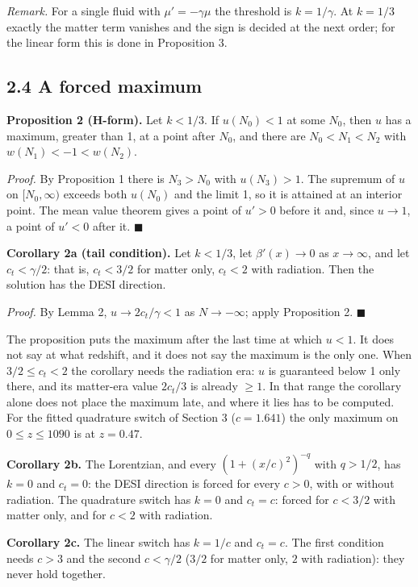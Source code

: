 \documentclass[11pt,a4paper]{article}
\begin{document}
\emph{Remark.} For a single fluid with $\mu' = -\gamma\mu$ the threshold is $k = 1/\gamma$. At $k = 1/3$ exactly the matter
term vanishes and the sign is decided at the next order; for the linear form this is done in Proposition 3.


\subsection*{2.4 A forced maximum}
{\bfseries\boldmath Proposition 2 (H-form).} Let $k < 1/3$. If $u(N_0) < 1$ at some $N_0$, then $u$ has a maximum, greater than 1, at a
point after $N_0$, and there are $N_0 < N_1 < N_2$ with $w(N_1) < -1 < w(N_2)$.

\emph{Proof.} By Proposition 1 there is $N_3 > N_0$ with $u(N_3) > 1$. The supremum of $u$ on $[N_0, \infty)$ exceeds both
$u(N_0)$ and the limit 1, so it is attained at an interior point. The mean value theorem gives a point of $u' > 0$
before it and, since $u \to 1$, a point of $u' < 0$ after it. \hfill$\blacksquare$

{\bfseries\boldmath Corollary 2a (tail condition).} Let $k < 1/3$, let $\beta'(x) \to 0$ as $x \to \infty$, and let $c_t < \gamma/2$: that is,
$c_t < 3/2$ for matter only, $c_t < 2$ with radiation. Then the solution has the DESI direction.

\emph{Proof.} By Lemma 2, $u \to 2c_t/\gamma < 1$ as $N \to -\infty$; apply Proposition 2. \hfill$\blacksquare$

The proposition puts the maximum after the last time at which $u < 1$. It does not say at what redshift, and it does
not say the maximum is the only one. When $3/2 \le c_t < 2$ the corollary needs the radiation era: $u$ is guaranteed
below 1 only there, and its matter-era value $2c_t/3$ is already $\ge 1$. In that range the corollary alone does not place
the maximum late, and where it lies has to be computed. For the fitted quadrature switch of Section 3
($c = 1.641$) the only maximum on $0 \le z \le 1090$ is at $z = 0.47$.

{\bfseries\boldmath Corollary 2b.} The Lorentzian, and every $(1 + (x/c)^2)^{-q}$ with $q > 1/2$, has $k = 0$ and $c_t = 0$: the DESI
direction is forced for every $c > 0$, with or without radiation. The quadrature switch has $k = 0$ and $c_t = c$:
forced for $c < 3/2$ with matter only, and for $c < 2$ with radiation.

{\bfseries\boldmath Corollary 2c.} The linear switch has $k = 1/c$ and $c_t = c$. The first condition needs $c > 3$ and the second
$c < \gamma/2$ ($3/2$ for matter only, $2$ with radiation): they never hold together.
\end{document}
